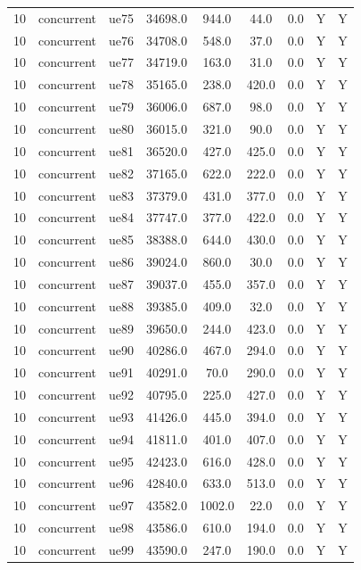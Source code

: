 \begin{table}[ht]
\begin{tabular}{|c|c|c|c|c|c|c|c|c|}
10 & concurrent & ue75 & 34698.0 & 944.0 & 44.0 & 0.0 & Y & Y \\
10 & concurrent & ue76 & 34708.0 & 548.0 & 37.0 & 0.0 & Y & Y \\
10 & concurrent & ue77 & 34719.0 & 163.0 & 31.0 & 0.0 & Y & Y \\
10 & concurrent & ue78 & 35165.0 & 238.0 & 420.0 & 0.0 & Y & Y \\
10 & concurrent & ue79 & 36006.0 & 687.0 & 98.0 & 0.0 & Y & Y \\
10 & concurrent & ue80 & 36015.0 & 321.0 & 90.0 & 0.0 & Y & Y \\
10 & concurrent & ue81 & 36520.0 & 427.0 & 425.0 & 0.0 & Y & Y \\
10 & concurrent & ue82 & 37165.0 & 622.0 & 222.0 & 0.0 & Y & Y \\
10 & concurrent & ue83 & 37379.0 & 431.0 & 377.0 & 0.0 & Y & Y \\
10 & concurrent & ue84 & 37747.0 & 377.0 & 422.0 & 0.0 & Y & Y \\
10 & concurrent & ue85 & 38388.0 & 644.0 & 430.0 & 0.0 & Y & Y \\
10 & concurrent & ue86 & 39024.0 & 860.0 & 30.0 & 0.0 & Y & Y \\
10 & concurrent & ue87 & 39037.0 & 455.0 & 357.0 & 0.0 & Y & Y \\
10 & concurrent & ue88 & 39385.0 & 409.0 & 32.0 & 0.0 & Y & Y \\
10 & concurrent & ue89 & 39650.0 & 244.0 & 423.0 & 0.0 & Y & Y \\
10 & concurrent & ue90 & 40286.0 & 467.0 & 294.0 & 0.0 & Y & Y \\
10 & concurrent & ue91 & 40291.0 & 70.0 & 290.0 & 0.0 & Y & Y \\
10 & concurrent & ue92 & 40795.0 & 225.0 & 427.0 & 0.0 & Y & Y \\
10 & concurrent & ue93 & 41426.0 & 445.0 & 394.0 & 0.0 & Y & Y \\
10 & concurrent & ue94 & 41811.0 & 401.0 & 407.0 & 0.0 & Y & Y \\
10 & concurrent & ue95 & 42423.0 & 616.0 & 428.0 & 0.0 & Y & Y \\
10 & concurrent & ue96 & 42840.0 & 633.0 & 513.0 & 0.0 & Y & Y \\
10 & concurrent & ue97 & 43582.0 & 1002.0 & 22.0 & 0.0 & Y & Y \\
10 & concurrent & ue98 & 43586.0 & 610.0 & 194.0 & 0.0 & Y & Y \\
10 & concurrent & ue99 & 43590.0 & 247.0 & 190.0 & 0.0 & Y & Y \\

\end{tabular}
\end{table}
